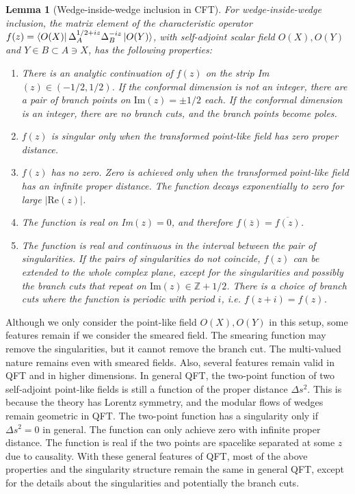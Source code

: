\documentclass[a4paper,11pt]{article}
\newtheorem{lemma}[theorem]{Lemma}
\theoremstyle{definition}
\begin{document}
\begin{lemma} [Wedge-inside-wedge inclusion in CFT]
    For wedge-inside-wedge inclusion, the matrix element of the characteristic operator $f(z) = \bra{O(X)}\Delta_A^{1/2+iz}\Delta_B^{-iz}\ket{O(Y)}$, with self-adjoint scalar field $O(X), O(Y)$ and $Y\in B \subset A \ni X$, has the following properties:
    \begin{enumerate}
        \item There is an analytic continuation of $f(z)$ on the strip Im$(z)\in (-1/2,1/2)$. If the conformal dimension is not an integer, there are a pair of branch points on $\text{Im}(z)=\pm1/2$ each. If the conformal dimension is an integer, there are no branch cuts, and the branch points become poles.
        \item $f(z)$ is singular only when the transformed point-like field has zero proper distance.
        \item $f(z)$ has no zero. Zero is achieved only when the transformed point-like field has an infinite proper distance. The function decays exponentially to zero for large $|\text{Re}(z)|$.
        \item The function is real on Im$(z) = 0$, and therefore $f(\overline{z}) = \overline{f(z)}$.
        \item The function is real and continuous in the interval between the pair of singularities. If the pairs of singularities do not coincide, $f(z)$ can be extended to the whole complex plane, except for the singularities and possibly the branch cuts that repeat on $\text{Im}(z) \in \mathbb{Z} +1/2$. There is a choice of branch cuts where the function is periodic with period $i$, i.e. $f(z+i)=f(z)$. 
    \end{enumerate}
\end{lemma}

Although we only consider the point-like field $O(X),O(Y)$ in this setup, some features remain if we consider the smeared field. The smearing function may remove the singularities, but it cannot remove the branch cut. The multi-valued nature remains even with smeared fields. Also, several features remain valid in QFT and in higher dimensions. In general QFT, the two-point function of two self-adjoint point-like fields is still a function of the proper distance $\Delta s^2$. This is because the theory has Lorentz symmetry, and the modular flows of wedges remain geometric in QFT. The two-point function has a singularity only if $\Delta s^2 = 0$ in general. The function can only achieve zero with infinite proper distance. The function is real if the two points are spacelike separated at some $z$ due to causality. With these general features of QFT, most of the above properties and the singularity structure remain the same in general QFT, except for the details about the singularities and potentially the branch cuts. 
\end{document}
